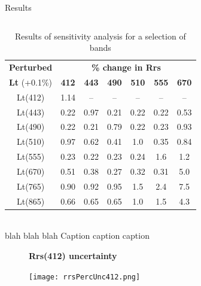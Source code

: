\documentclass[final]{beamer}
\newlength{\onecolwid}
\newlength{\twocolwid}
\begin{document}
\begin{frame}[t]
\begin{columns}[t]
\begin{column}{\twocolwid}
\begin{block}{Results}
\begin{columns}[t,totalwidth=\twocolwid] %
\begin{column}{\onecolwid}\vspace{-.6in} 

\begin{table}
\centering
\vspace{2ex}
\caption{Results of sensitivity analysis for a selection of bands}
\begin{tabular}{|*{7}{c|}}
\toprule
\textbf{Perturbed} & \multicolumn{6}{|c|}{\textbf{\% change in Rrs}}\\
\cline{2-7}
\textbf{Lt} (+0.1\%) & \textbf{412} & \textbf{443} & \textbf{490} & \textbf{510} & \textbf{555} & \textbf{670}\\
\midrule
Lt(412) &  1.14 & -- & -- & -- & -- & --\\  
Lt(443) & 0.22 & 0.97 & 0.21 & 0.22 & 0.22 &  0.53\\
Lt(490) & 0.22 & 0.21 & 0.79 & 0.22 & 0.23 &  0.93\\
Lt(510) & 0.97 & 0.62 & 0.41 &  1.0 & 0.35 & 0.84\\
Lt(555) & 0.23 & 0.22 & 0.23 & 0.24 & 1.6 & 1.2\\
Lt(670) & 0.51 & 0.38 & 0.27 & 0.32 & 0.31 &  5.0\\
Lt(765) & 0.90 & 0.92 & 0.95 &  1.5 &  2.4 &  7.5\\
Lt(865) & 0.66 & 0.65 & 0.65 &  1.0 &  1.5 &  4.3\\
\bottomrule
\end{tabular}
\\{blah blah blah Caption caption caption}
\end{table}
\begin{figure}
\vspace{5in}
\centering
\textbf{Rrs(412) uncertainty}\par\medskip
\texttt{[image: rrsPercUnc412.png]}
\end{figure}
\end{column} 

\begin{column}{\onecolwid}\vspace{-.6in} %



\end{column}
\end{columns}
\end{block}
\end{column}
\end{columns}
\end{frame}
\end{document}
